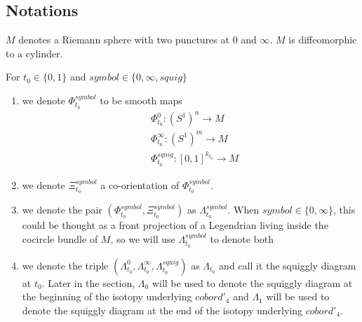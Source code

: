 \subsection*{Notations}
\begin{definition}
$M$ denotes a Riemann sphere with two punctures at $0$ and $\infty$. $M$ is diffeomorphic to a cylinder.
\end{definition}
\begin{definition}
For $t_0\in\{0,1\}$ and $symbol\in\{0,\infty, squig \}$
\begin{enumerate}
\item we denote $\Phi_{t_0}^{symbol}$ to be smooth maps
\begin{align*}
&\Phi_{t_0}^0 : (S^1)^n \rightarrow M \\
&\Phi_{t_0}^\infty : (S^1)^m \rightarrow M \\
&\Phi_{t_0}^{squig} : [0,1]^{k_{t_0}} \rightarrow M
\end{align*}

\item we denote $\Xi_{t_0}^{symbol}$ a co-orientation of $\Phi_{t_0}^{symbol}$.

\item we denote the pair $(\Phi_{t_0}^{symbol},\Xi_{t_0}^{symbol})$ as $\Lambda_{t_0}^{symbol}$. When $symbol \in \{0,\infty\}$, this could be thought as a front projection of a Legendrian living inside the cocircle bundle of $M$, so we will use $\Lambda_{t_0}^{symbol}$ to denote both

\item we denote the triple $(\Lambda_{t_0}^{0},\Lambda_{t_0}^{\infty},\Lambda_{t_0}^{squig})$ as $\Lambda_{t_0}$ and call it the squiggly diagram at $t_0$. Later in the section, $\Lambda_0$ will be used to denote the squiggly diagram at the beginning of the isotopy underlying $cobord'_4$ and $\Lambda_1$ will be used to denote the squiggly diagram at the end of the isotopy underlying $cobord'_4$. 
\end{enumerate}
\end{definition}

